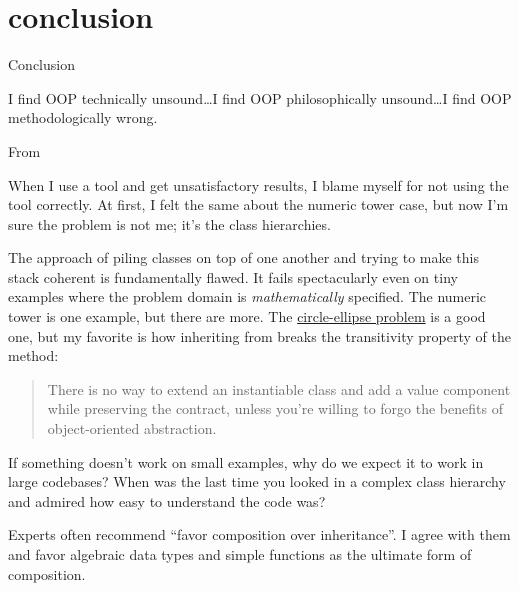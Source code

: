 \documentclass{article}
\begin{document}
\section{conclusion}{Conclusion}

\epigraph{I find OOP technically unsound\ldots  I find OOP philosophically unsound\ldots  I find OOP methodologically wrong.}{From \href{http://stlport.org/resources/StepanovUSA.html}{\cite{An Interview with A. Stepanov}}}

When I use a tool and get unsatisfactory results, I blame myself for not using the tool correctly.
At first, I felt the same about the numeric tower case, but now I'm sure the problem is not me; it's the class hierarchies.

The approach of piling classes on top of one another and trying to make this stack coherent is fundamentally flawed.
It fails spectacularly even on tiny examples where the problem domain is \emph{mathematically} specified.
The numeric tower is one example, but there are more.
The \href{https://en.wikipedia.org/wiki/Circle%E2%80%93ellipse_problem}{circle-ellipse problem} is a good one,
but my favorite is how inheriting  from  breaks the transitivity property of the  method:

\blockquote{
    There is no way to extend an instantiable class and add a value component while preserving the  contract,
    unless you're willing to forgo the benefits of object-oriented abstraction.
}{}

If something doesn't work on small examples, why do we expect it to work in large codebases?
When was the last time you looked in a complex class hierarchy and admired how easy to understand the code was?

Experts often recommend ``favor composition over inheritance''.
I agree with them and favor algebraic data types and simple functions as the ultimate form of composition.
\end{document}
